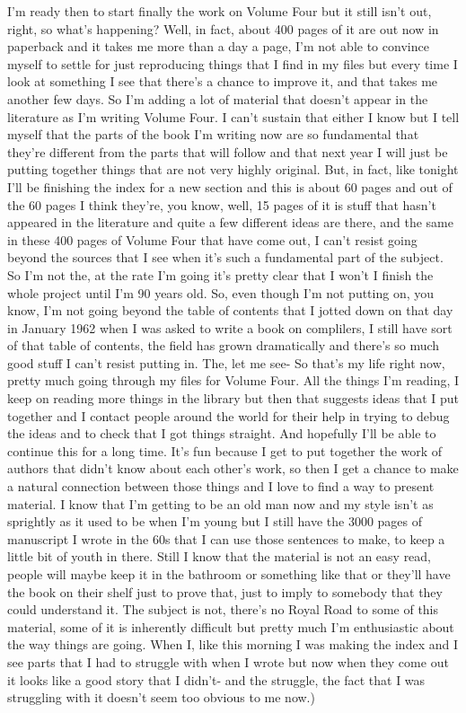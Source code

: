 \documentclass[]{article}
\begin{document}
I'm ready then to start finally the work on Volume Four but it still
isn't out, right, so what's happening? Well, in fact, about 400 pages of
it are out now in paperback and it takes me more than a day a page, I'm
not able to convince myself to settle for just reproducing things that I
find in my files but every time I look at something I see that there's a
chance to improve it, and that takes me another few days. So I'm adding
a lot of material that doesn't appear in the literature as I'm writing
Volume Four. I can't sustain that either I know but I tell myself that
the parts of the book I'm writing now are so fundamental that they're
different from the parts that will follow and that next year I will just
be putting together things that are not very highly original. But, in
fact, like tonight I'll be finishing the index for a new section and
this is about 60 pages and out of the 60 pages I think they're, you
know, well, 15 pages of it is stuff that hasn't appeared in the
literature and quite a few different ideas are there, and the same in
these 400 pages of Volume Four that have come out, I can't resist going
beyond the sources that I see when it's such a fundamental part of the
subject. So I'm not the, at the rate I'm going it's pretty clear that I
won't I finish the whole project until I'm 90 years old. So, even though
I'm not putting on, you know, I'm not going beyond the table of contents
that I jotted down on that day in January 1962 when I was asked to write
a book on complilers, I still have sort of that table of contents, the
field has grown dramatically and there's so much good stuff I can't
resist putting in. The, let me see- So that's my life right now, pretty
much going through my files for Volume Four. All the things I'm reading,
I keep on reading more things in the library but then that suggests
ideas that I put together and I contact people around the world for
their help in trying to debug the ideas and to check that I got things
straight. And hopefully I'll be able to continue this for a long time.
It's fun because I get to put together the work of authors that didn't
know about each other's work, so then I get a chance to make a natural
connection between those things and I love to find a way to present
material. I know that I'm getting to be an old man now and my style
isn't as sprightly as it used to be when I'm young but I still have the
3000 pages of manuscript I wrote in the 60s that I can use those
sentences to make, to keep a little bit of youth in there. Still I know
that the material is not an easy read, people will maybe keep it in the
bathroom or something like that or they'll have the book on their shelf
just to prove that, just to imply to somebody that they could understand
it. The subject is not, there's no Royal Road to some of this material,
some of it is inherently difficult but pretty much I'm enthusiastic
about the way things are going. When I, like this morning I was making
the index and I see parts that I had to struggle with when I wrote but
now when they come out it looks like a good story that I didn't- and the
struggle, the fact that I was struggling with it doesn't seem too
obvious to me now.)
\end{document}
